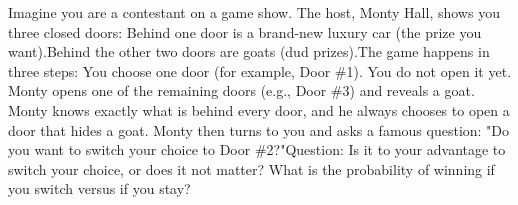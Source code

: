 Imagine you are a contestant on a game show. The host, Monty Hall, shows you three closed doors: Behind one door is a brand-new luxury car (the prize you want).Behind the other two doors are goats (dud prizes).The game happens in three steps: You choose one door (for example, Door \#1). You do not open it yet. Monty opens one of the remaining doors (e.g., Door \#3) and reveals a goat. Monty knows exactly what is behind every door, and he always chooses to open a door that hides a goat. Monty then turns to you and asks a famous question: "Do you want to switch your choice to Door \#2?"Question: Is it to your advantage to switch your choice, or does it not matter? What is the probability of winning if you switch versus if you stay?

